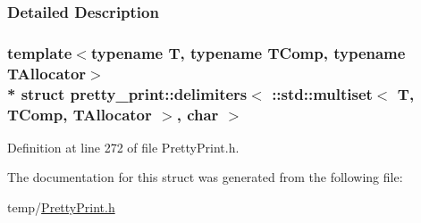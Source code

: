 \subsubsection{Detailed Description}
\subsubsection*{template$<$typename T, typename T\+Comp, typename T\+Allocator$>$\\*
struct pretty\+\_\+print\+::delimiters$<$ \+::std\+::multiset$<$ T, T\+Comp, T\+Allocator $>$, char $>$}



Definition at line 272 of file Pretty\+Print.\+h.



The documentation for this struct was generated from the following file\+:\begin{DoxyCompactItemize}
\item 
temp/\hyperlink{PrettyPrint_8h}{Pretty\+Print.\+h}\end{DoxyCompactItemize}
